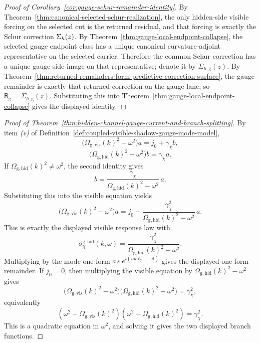 \begin{proof}[Proof of Corollary~\ref{cor:gauge-schur-remainder-identity}]
\label{proof:cor:gauge-schur-remainder-identity}
By Theorem~\ref{thm:canonical-selected-schur-realization}, the only hidden-side
visible forcing on the selected cut is the returned residual, and that forcing
is exactly the Schur correction \(\Sigma_{h}(z)\). By
Theorem~\ref{thm:gauge-local-endpoint-collapse}, the selected gauge endpoint
class has a unique canonical curvature-adjoint representative on the selected
carrier. Therefore the common Schur correction has a unique gauge-side image on
that representative; denote it by \(\Sigma_{h,\mathrm g}(z)\). By
Theorem~\ref{thm:returned-remainders-form-predictive-correction-surface}, the
gauge remainder is exactly that returned correction on the gauge lane, so
\(\mathsf R_{\mathrm g}=\Sigma_{h,\mathrm g}(z)\). Substituting this into
Theorem~\ref{thm:gauge-local-endpoint-collapse} gives the displayed identity.
\end{proof}

\begin{proof}[Proof of Theorem~\ref{thm:hidden-channel-gauge-current-and-branch-splitting}]
\label{proof:thm:hidden-channel-gauge-current-and-branch-splitting}
By item \emph{(v)} of
Definition~\ref{def:coupled-visible-shadow-gauge-mode-model},
\[
\bigl(\Omega_{\mathrm{g,vis}}(k)^2-\omega^2\bigr)a
=
j_0+\gamma_{\chi}b,
\]
\[
\bigl(\Omega_{\mathrm{g,hid}}(k)^2-\omega^2\bigr)b
=
\gamma_{\chi}a.
\]
If \(\Omega_{\mathrm{g,hid}}(k)^2\neq\omega^2\), the second identity gives
\[
b
=
\frac{\gamma_{\chi}}{\Omega_{\mathrm{g,hid}}(k)^2-\omega^2}\,a.
\]
Substituting this into the visible equation yields
\[
\bigl(\Omega_{\mathrm{g,vis}}(k)^2-\omega^2\bigr)a
=
j_0
+
\frac{\gamma_{\chi}^2}{\Omega_{\mathrm{g,hid}}(k)^2-\omega^2}\,a.
\]
This is exactly the displayed visible response law with
\[
\sigma_{\chi}^{\mathrm{g,hid}}(k,\omega)
=
\frac{\gamma_{\chi}^2}{\Omega_{\mathrm{g,hid}}(k)^2-\omega^2}.
\]
Multiplying by the mode one-form
\(a\,\varepsilon\,e^{i(nk\ell_{\chi}-\omega t)}\) gives the displayed
one-form remainder. If \(j_0=0\), then multiplying the visible equation by
\(\Omega_{\mathrm{g,hid}}(k)^2-\omega^2\) gives
\[
\bigl(\Omega_{\mathrm{g,vis}}(k)^2-\omega^2\bigr)
\bigl(\Omega_{\mathrm{g,hid}}(k)^2-\omega^2\bigr)
=
\gamma_{\chi}^2,
\]
equivalently
\[
(\omega^2-\Omega_{\mathrm{g,vis}}(k)^2)
(\omega^2-\Omega_{\mathrm{g,hid}}(k)^2)
=
\gamma_{\chi}^2.
\]
This is a quadratic equation in \(\omega^2\), and solving it gives the two
displayed branch functions.
\end{proof}

